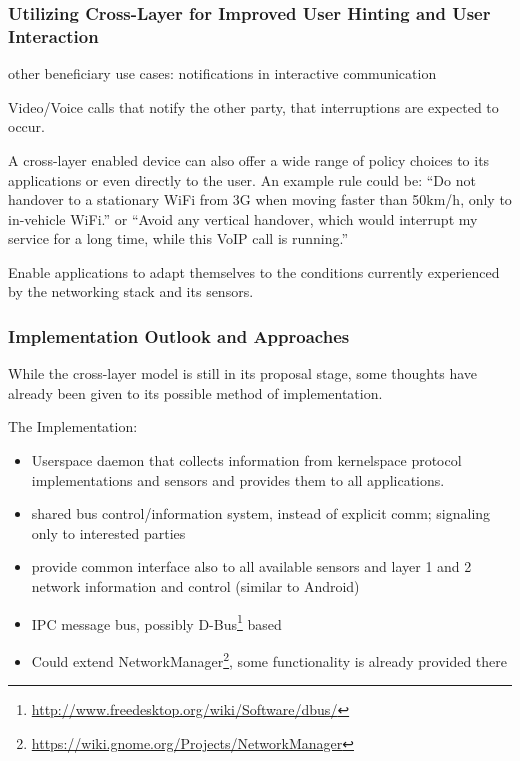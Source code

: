 \subsubsection{Utilizing  Cross-Layer for Improved User Hinting and User Interaction}

 other beneficiary use cases: notifications in interactive communication

Video/Voice calls that notify the other party, that interruptions are expected to occur.

A cross-layer enabled device can also offer a wide range of policy choices to its applications or even directly to the user. An example rule could be: ``Do not handover to a stationary WiFi from 3G when moving faster than 50km/h, only to in-vehicle WiFi.'' or ``Avoid any vertical handover, which would interrupt my service for a long time, while this VoIP call is running.''

Enable applications to adapt themselves to the conditions currently experienced by the networking stack and its sensors. 




\subsubsection{Implementation Outlook and Approaches}

While the cross-layer model is still in its proposal stage, some thoughts have already been given to its possible method of implementation.

The Implementation:
\begin{itemize}
	\item Userspace daemon that collects information from kernelspace protocol implementations and sensors and provides them to all applications.
	\item shared bus control/information system, instead of explicit comm; signaling only to interested parties
	\item provide common interface also to all available sensors and layer 1 and 2 network information and control (similar to Android)
	\item IPC message bus, possibly D-Bus\footnote{\url{http://www.freedesktop.org/wiki/Software/dbus/}} based
	\item Could extend NetworkManager\footnote{\url{https://wiki.gnome.org/Projects/NetworkManager}}, some functionality is already provided there
\end{itemize}

